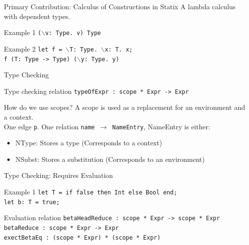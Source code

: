 \documentclass[aspectratio=43]{beamer}
\begin{document}
\begin{frame}[fragile]{Primary Contribution: Calculus of Constructions in Statix}
	A lambda calculus with dependent types.
	
	\begin{exampleblock}{Example 1}
		\texttt{($\backslash$v: Type. v) Type}
	\end{exampleblock}

	\begin{exampleblock}{Example 2}
		\texttt{let f = $\backslash$T: Type. $\backslash$x: T. x; \\
f (T: Type -> Type) ($\backslash$y: Type. y)
		}
	\end{exampleblock}

\end{frame}

\begin{frame}[fragile]{Type Checking}
	\begin{block}{Type checking relation}
		\texttt{typeOfExpr : scope * Expr -> Expr}
	\end{block}
	\begin{block}{How do we use scopes?}
		A scope is used as a replacement for an environment and a context.\\
		One edge \verb|p|. One relation \texttt{name $\rightarrow$ NameEntry}, NameEntry is either:
		\begin{itemize}
			\item NType: Stores a type (Corresponds to a context)
			\item NSubst: Stores a substitution (Corresponds to an environment)
		\end{itemize}
	\end{block}
\end{frame}

\begin{frame}[fragile]{Type Checking: Requires Evaluation}
	\begin{exampleblock}{Example 1}
		\texttt{let T = if false then Int else Bool end;\\let b: T = true;}
	\end{exampleblock}
	\begin{block}{Evaluation relation} 
		\texttt{betaHeadReduce : scope * Expr -> scope * Expr} \\
		\texttt{betaReduce : scope * Expr -> Expr} \\
		\texttt{exectBetaEq : (scope * Expr) * (scope * Expr)}
	\end{block}
\end{frame}
\end{document}
